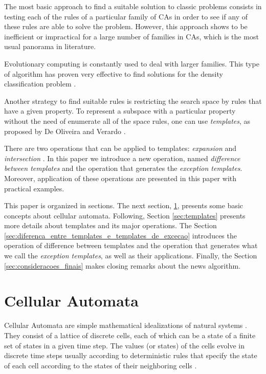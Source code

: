 \documentclass{llncs}
\begin{document}
The most basic approach to find a suitable solution to classic problems consists in testing each of the rules of a particular family of CAs in order to see if any of these rules are able to solve the problem. However, this approach shows to be inefficient or impractical for a large number of families in CAs, which is the most usual panorama in literature.

Evolutionary computing is constantly used to deal with larger families. This type of algorithm has proven very effective to find solutions for the density classification problem \cite{wolz2008very}.

Another strategy to find suitable rules is restricting the search space by rules that have a given property. To represent a subspace with a particular property without the need of enumerate all of the space rules, one can use \textit{templates}, as proposed by De Oliveira and Verardo  \cite{deOliveira2014,deOliveira2014b}.

There are two operations that can be applied to templates: \textit{expansion} and \textit{intersection} \cite{deOliveira2014,deOliveira2014b}. In this paper we introduce a new operation, named \textit{difference between templates} and the operation that generates the \textit{exception templates}. Moreover, application of these operations are presented in this paper with practical examples.

This paper is organized in sections. The next section, \ref{sec:automatos_celulares}, presents some basic concepts about cellular automata. Following, Section \ref{sec:templates} presents more details about templates and its major operations. The Section \ref{sec:diferenca_entre_templates_e_templates_de_excecao} introduces the operation of difference between templates and the operation that generates what we call the \textit{exception templates}, as well as their applications. Finally, the Section \ref{sec:consideracoes_finais} makes closing remarks about the news algorithm.

\section{Cellular Automata}
\label{sec:automatos_celulares}
Cellular Automata are simple mathematical idealizations of natural systems \cite{wolfram1994cellular}. They consist of a lattice of discrete cells, each of which can be a state of a finite set of states in a given time step. The values (or states) of the cells evolve in discrete time steps usually according to deterministic rules that specify the state of each cell according to the states of their neighboring cells \cite{wolfram1994cellular}.%
\end{document}
